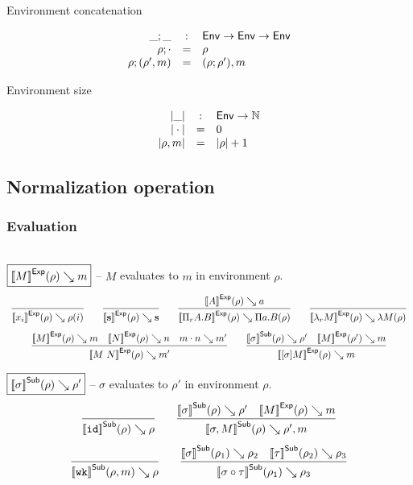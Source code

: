 \noindent
Environment concatenation

\[
\begin{array}{rcl}
  \_;\_                     & : & \mathsf{Env} \to \mathsf{Env} \to \mathsf{Env} \\
  \rho;\cdot         & = & \rho \\
  \rho;(\rho', m) & = & (\rho;\rho'), m
\end{array}
\]

\noindent
Environment size

\[
\begin{array}{rcl}
  |\_|                & : & \mathsf{Env} \to \mathbb{N} \\
  |\cdot|        & = & 0 \\
  |\rho, m| & = & |\rho| + 1
\end{array}
\]


\subsection{Normalization operation}

\subsubsection{Evaluation} \hfill\\

\noindent
$\boxed{{[\![M]\!]}^{\mathsf{Exp}}(\rho) \searrow m}$ -- $M$ evaluates to $m$ in environment $\rho$.
\[
\begin{array}{c}
  \infer{
    \evalexp {x_i} \rho {\rho(i)}
  }{
  }
  \qquad
  \infer{
    \evalexp {\tmcst s} \rho {\dcst s}
  }{
  }
  \qquad
  \infer{
    \evalexp {\tppi A B} \rho {\dpi a B \rho}
  }{
    \evalexp A \rho a
  }
  \qquad
  \infer{
    \evalexp {\tmlam M} \rho {\dlam M \rho}
  }{
  }
  \\[8pt]
  \infer{
    \evalexp {\tmapp M N} \rho {m'}
  }{
    \evalexp M \rho m
    &
    \evalexp N \rho n
    &
    \evalapp m n {m'}
  }
  \qquad
  \infer{
    \evalexp {\tmclo \sigma M} \rho m
  }{
    \evalsub \sigma \rho {\rho'}
    &
    \evalexp M {\rho'} m
  }
\end{array}
\]

\noindent
$\boxed{{[\![\sigma]\!]}^{\mathsf{Sub}}(\rho) \searrow \rho'}$ -- $\sigma$ evaluates to $\rho'$ in environment $\rho$.
\[
\begin{array}{c}
  \infer{
    \evalsub \subid \rho \rho
  }{
  }
  \qquad
  \infer{
    \evalsub {\subext \sigma M} \rho {\rho', m}
  }{
    \evalsub \sigma \rho {\rho'}
    &
    \evalexp M \rho m
  }
  \\[8pt]
  \infer{
    \evalsub \subwk {\rho, m} \rho
  }{
  }
  \qquad
  \infer{
    \evalsub {\subclo \sigma \tau} {\rho_1} {\rho_3}
  }{
    \evalsub \sigma {\rho_1} {\rho_2}
    &
    \evalsub \tau {\rho_2} {\rho_3}
  }
\end{array}
\]

